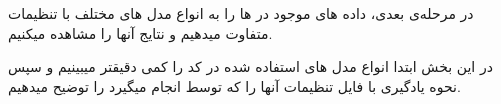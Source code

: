 در مرحله‌ی بعدی، داده های موجود در  ها را به انواع مدل های مختلف با تنظیمات متفاوت میدهیم و نتایج آنها را مشاهده میکنیم. 

در این بخش ابتدا انواع مدل های استفاده شده در کد را کمی دقیقتر میبینیم و سپس نحوه یادگیری با فایل تنظیمات آنها را که توسط 
انجام میگیرد را توضیح میدهیم. 
